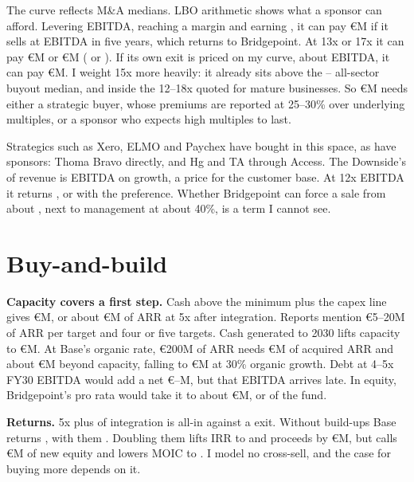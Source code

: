 The curve reflects M\&A medians. LBO arithmetic shows what a sponsor can afford. Levering  EBITDA, reaching a  margin and earning , it can pay €M if it sells at  EBITDA in five years, which returns  to Bridgepoint. At 13x or 17x it can pay €M or €M ( or ). If its own exit is priced on my curve, about  EBITDA, it can pay €M. I weight 15x more heavily: it already sits above the -- all-sector buyout median, and inside the 12--18x quoted for mature businesses. So €M needs either a strategic buyer, whose premiums are reported at 25--30\% over underlying multiples, or a sponsor who expects high multiples to last.

Strategics such as Xero, ELMO and Paychex have bought in this space, as have sponsors: Thoma Bravo directly, and Hg and TA through Access. The Downside's  of revenue is  EBITDA on  growth, a price for the customer base. At 12x EBITDA it returns , or  with the preference. Whether Bridgepoint can force a sale from about , next to management at about 40\%, is a term I cannot see.

\section{Buy-and-build}
\textbf{Capacity covers a first step.} Cash above the minimum plus the capex line gives €M, or about €M of ARR at 5x after integration. Reports mention €5--20M of ARR per target and four or five targets. Cash generated to 2030 lifts capacity to €M. At Base's organic rate, €200M of ARR needs €M of acquired ARR and about €M beyond capacity, falling to €M at 30\% organic growth. Debt at 4--5x FY30 EBITDA would add a net €--M, but that EBITDA arrives late. In equity, Bridgepoint's pro rata would take it to about €M, or  of the fund.

\textbf{Returns.} 5x plus  of integration is  all-in against a  exit. Without build-ups Base returns , with them . Doubling them lifts IRR to  and proceeds by €M, but calls €M of new equity and lowers MOIC to . I model no cross-sell, and the case for buying more depends on it.

